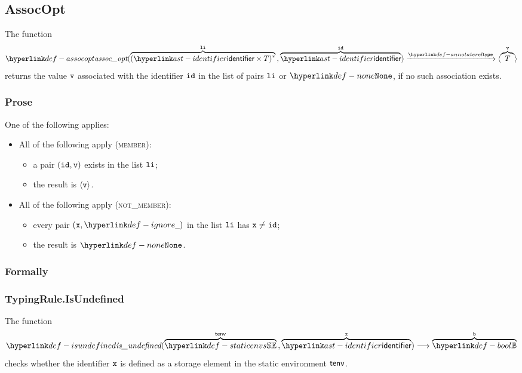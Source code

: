 \subsection{AssocOpt}
\hypertarget{def-assocopt}{}
The function
\[
  \assocopt(\overname{(\identifier\times T)^*}{\vli} \aslsep \overname{\identifier}{\id}) \typearrow \langle \overname{T}{\vv} \rangle
\]
returns the value $\texttt{v}$ associated with the identifier $\texttt{id}$ in the list of pairs $\texttt{li}$ or $\None$, if no such association exists.

\subsubsection{Prose}
One of the following applies:
\begin{itemize}
  \item All of the following apply (\textsc{member}):
  \begin{itemize}
    \item a pair $(\texttt{id},\texttt{v})$ exists in the list $\texttt{li}$;
    \item the result is $\langle\texttt{v}\rangle$.
  \end{itemize}

  \item All of the following apply (\textsc{not\_member}):
  \begin{itemize}
    \item every pair $(\vx,\Ignore)$ in the list $\texttt{li}$ has $\texttt{x}\neq\texttt{id}$;
    \item the result is $\None$.
  \end{itemize}
\end{itemize}

\subsubsection{Formally}

\subsubsection{TypingRule.IsUndefined \label{sec:TypingRule.IsUndefined}}
\hypertarget{def-isundefined}{}
The function
\[
\isundefined(\overname{\staticenvs}{\tenv} \aslsep \overname{\identifier}{\vx})
\aslto \overname{\Bool}{\vb}
\]
checks whether the identifier $\texttt{x}$ is defined as a storage element in the static environment $\textsf{tenv}$.

